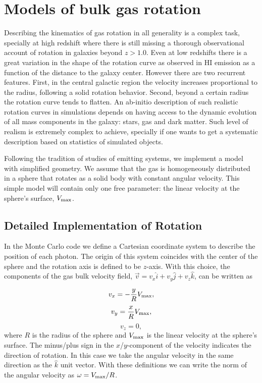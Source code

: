 \documentclass{emulateapj}
\newcommand{\ly}{{\ifmmode{{\rm Ly}\alpha~}\else{Ly$\alpha$~}\fi}}
\begin{document}
\section{Models of bulk gas rotation}
\label{sec:implementation}

Describing the kinematics of gas rotation in all generality is a
complex task, specially at high redshift where there is still missing
a thorough observational account of rotation in galaxies beyond
$z>1.0$. Even at low redshifts there is a great
variation in the shape of the rotation curve as observed in HI
emission as a function of the distance to the galaxy center. However
there are two recurrent features. First, in the
central galactic region the velocity increases proportional to the radius,
following a solid rotation behavior. Second, beyond a certain radius
the rotation curve tends to flatten.  An ab-initio description of
such realistic rotation curves in simulations depends on having access to
the dynamic evolution of all mass components in the galaxy: stars, gas
and dark matter. Such level of realism is extremely complex to
achieve, specially if one wants to get a systematic description based
on statistics of simulated objects. 

Following the tradition of studies of \ly emitting systems,
we implement a model with simplified geometry. We assume that the gas
is homogeneously distributed in a sphere that rotates as a solid body
with constant angular velocity. This simple model will contain only
one free parameter: the linear velocity at the sphere's surface, $V_{\rm
  max}$. 

\subsection{Detailed Implementation of Rotation}

 In the Monte Carlo code we define a Cartesian coordinate system to
 describe the position of each photon. The origin of this system
 coincides with the center of the sphere and the rotation axis is defined
 to be $z$-axis. With this choice, the components of the gas bulk velocity
 field, $\vec{v} = v_{x}\hat{i} + v_{y}\hat{j} + v_{z}\hat{k}$, can be
 written as  
  
\begin{equation}
    v_{x}=-\frac{y}{R}V_{\rm max}, \label{subeq1}
\end{equation}
\begin{equation}
    v_{y}=\frac{x}{R}V_{\rm max}, \label{subeq2}
\end{equation}
\begin{equation}
    v_{z}=0, \label{subeq3}
\end{equation}
%
where $R$ is the radius of the sphere and $V_{\rm max}$ is the linear
velocity at the sphere's surface. The minus/plus sign in the
$x$/$y$-component of the velocity indicates the direction of
rotation. In this case we take the angular velocity in the same
direction as the $\hat{k}$ unit vector. With these definitions we can
write the norm of the angular velocity as $\omega=V_{\rm max}/R$.  
\end{document}
